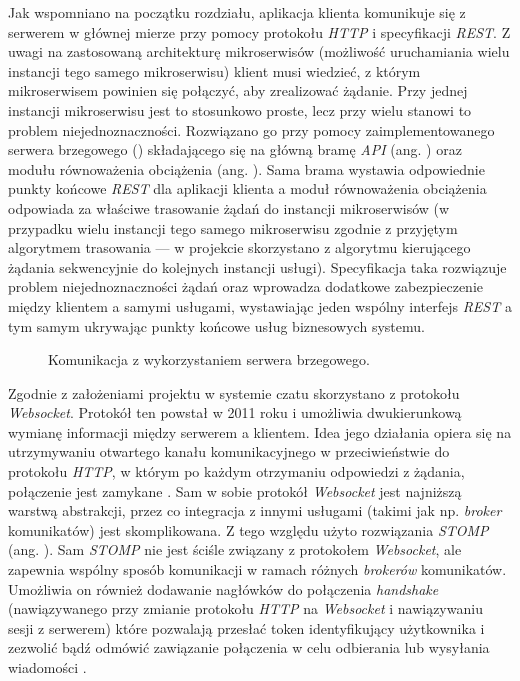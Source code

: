 Jak wspomniano na początku rozdziału, aplikacja klienta komunikuje się z serwerem w głównej mierze przy pomocy protokołu
\textit{HTTP} i specyfikacji \textit{REST}. Z uwagi na zastosowaną architekturę mikroserwisów (możliwość uruchamiania
wielu instancji tego samego mikroserwisu) klient musi wiedzieć, z którym mikroserwisem powinien się połączyć, aby
zrealizować żądanie. Przy jednej instancji mikroserwisu jest to stosunkowo proste, lecz przy wielu stanowi to problem
niejednoznaczności. Rozwiązano go przy pomocy zaimplementowanego serwera brzegowego ()
składającego się na główną bramę \textit{API} (ang. ) oraz modułu równoważenia obciążenia (ang.
). Sama brama wystawia odpowiednie punkty końcowe \textit{REST} dla aplikacji klienta a moduł
równoważenia obciążenia odpowiada za właściwe trasowanie żądań do instancji mikroserwisów (w przypadku wielu instancji
tego samego mikroserwisu zgodnie z przyjętym algorytmem trasowania — w projekcie skorzystano z algorytmu  kierującego żądania sekwencyjnie do kolejnych instancji usługi). Specyfikacja taka rozwiązuje problem
niejednoznaczności żądań oraz wprowadza dodatkowe zabezpieczenie między klientem a samymi usługami, wystawiając jeden
wspólny interfejs \textit{REST} a tym samym ukrywając punkty końcowe usług biznesowych systemu.
%
\begin{figure}[H]
  \centering
  \caption{Komunikacja z wykorzystaniem serwera brzegowego.}
  \label{fig:edge-server}
\end{figure}


Zgodnie z założeniami projektu w systemie czatu skorzystano z protokołu \textit{Websocket}. Protokół ten powstał w 2011
roku i umożliwia dwukierunkową wymianę informacji między serwerem a klientem. Idea jego działania opiera się na
utrzymywaniu otwartego kanału komunikacyjnego w przeciwieństwie do protokołu \textit{HTTP}, w którym po każdym
otrzymaniu odpowiedzi z żądania, połączenie jest zamykane \cite{bib:mdn-websockets}. Sam w sobie protokół
\textit{Websocket} jest najniższą warstwą abstrakcji, przez co integracja z innymi usługami (takimi jak np.
\textit{broker} komunikatów) jest skomplikowana. Z tego względu użyto rozwiązania \textit{STOMP} (ang. ). Sam \textit{STOMP} nie jest ściśle związany z protokołem \textit{Websocket}, ale
zapewnia wspólny sposób komunikacji w ramach różnych \textit{brokerów} komunikatów. Umożliwia on również dodawanie
nagłówków do połączenia \textit{handshake} (nawiązywanego przy zmianie protokołu \textit{HTTP} na \textit{Websocket} i
nawiązywaniu sesji z serwerem) które pozwalają przesłać token identyfikujący użytkownika i zezwolić bądź odmówić
zawiązanie połączenia w celu odbierania lub wysyłania wiadomości \cite{bib:stomp}.

